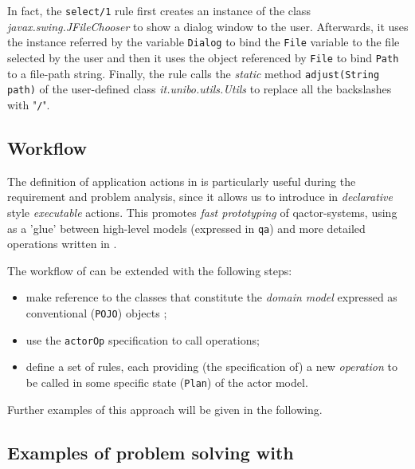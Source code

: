 In fact, the \texttt{select/1} rule first creates an instance of the \java{} class \textit{javax.swing.JFileChooser} to show a dialog window to the user. Afterwards, it uses the instance referred by the variable \texttt{Dialog} to bind the  \texttt{File} variable to the file selected by the user  and then it uses the object referenced by \texttt{File} to bind  \texttt{Path} to a file-path string.
Finally, the rule calls the \textit{static} method \texttt{adjust(String path)} of the user-defined class \textit{it.unibo.utils.Utils} to replace all the backslashes with "\texttt{/}".


 
\subsection{Workflow}

The definition of application actions in \tuprolog{} is particularly useful during the requirement and problem analysis, since it allows us to introduce in \textit{declarative} style \textit{executable} actions. This promotes \textit{fast prototyping} of  qactor-systems, using \tuprolog{} as a 'glue' between high-level models (expressed in \texttt{qa}) and more detailed operations written in \java. 

The workflow of  can be extended with the following steps:
\begin{itemize}
\item make reference to the \java{} classes that constitute the \textit{domain model} expressed as conventional (\texttt{POJO}) objects ; 
\item use the \texttt{actorOp} specification to call \java{} operations;
\item define a set of \prolog{} rules, each providing (the specification of) a new \textit{operation} to be called in some specific state (\texttt{Plan}) of the actor model.
\end{itemize}

Further examples of this approach will be given in the following.

\subsection{Examples of problem solving with \tuprolog{} }

